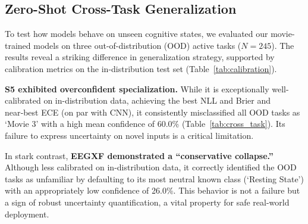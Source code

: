 \documentclass{article}
\newcommand{\eegtrans}{EEGXF}
\begin{document}
\subsection{Zero-Shot Cross-Task Generalization}
To test how models behave on unseen cognitive states, we evaluated our movie-trained models on three out-of-distribution (OOD) active tasks ($N=245$). The results reveal a striking difference in generalization strategy, supported by calibration metrics on the in-distribution test set (Table~\ref{tab:calibration}).

\textbf{S5 exhibited overconfident specialization.} While it is exceptionally well-calibrated on in-distribution data, achieving the best NLL and Brier and near‑best ECE (on par with CNN), it consistently misclassified all OOD tasks as `Movie 3' with a high mean confidence of 60.0\% (Table~\ref{tab:cross_task}). Its failure to express uncertainty on novel inputs is a critical limitation.

In stark contrast, \textbf{\eegtrans{} demonstrated a ``conservative collapse.''} Although less calibrated on in-distribution data, it correctly identified the OOD tasks as unfamiliar by defaulting to its most neutral known class (`Resting State') with an appropriately low confidence of 26.0\%. This behavior is not a failure but a sign of robust uncertainty quantification, a vital property for safe real-world deployment.

\end{document}
